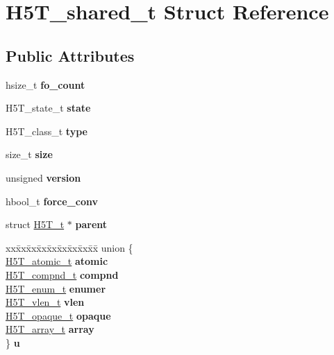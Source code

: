 \hypertarget{struct_h5_t__shared__t}{}\section{H5\+T\+\_\+shared\+\_\+t Struct Reference}
\label{struct_h5_t__shared__t}
\subsection*{Public Attributes}
\begin{DoxyCompactItemize}
\item 
\mbox{\label{struct_h5_t__shared__t_a907201693145b6bb5972f08ad03549a9}} 
hsize\+\_\+t {\bfseries fo\+\_\+count}
\item 
\mbox{\label{struct_h5_t__shared__t_afa6afd223dae67bfd710cae436a75c66}} 
H5\+T\+\_\+state\+\_\+t {\bfseries state}
\item 
\mbox{\label{struct_h5_t__shared__t_a402cd24dfc7b349e3644d9ef77fc1d69}} 
H5\+T\+\_\+class\+\_\+t {\bfseries type}
\item 
\mbox{\label{struct_h5_t__shared__t_a1d54432a0678f4c33b4ea48bd33b652e}} 
size\+\_\+t {\bfseries size}
\item 
\mbox{\label{struct_h5_t__shared__t_a19af917992ac1d4b69a6ffdd1dd8001e}} 
unsigned {\bfseries version}
\item 
\mbox{\label{struct_h5_t__shared__t_a8d68ca3b21ff1a2f5e0a449aa9395254}} 
hbool\+\_\+t {\bfseries force\+\_\+conv}
\item 
\mbox{\label{struct_h5_t__shared__t_a77cdc4361d60b9f0c647cc983d525aa9}} 
struct \hyperlink{struct_h5_t__t}{H5\+T\+\_\+t} $\ast$ {\bfseries parent}
\item 
\mbox{\label{struct_h5_t__shared__t_aa40c24475a8f1d291fa4b2369a83dd64}} 
\begin{tabbing}
xx\=xx\=xx\=xx\=xx\=xx\=xx\=xx\=xx\=\kill
union \{\\
\>\hyperlink{struct_h5_t__atomic__t}{H5T\_atomic\_t} {\bfseries atomic}\\
\>\hyperlink{struct_h5_t__compnd__t}{H5T\_compnd\_t} {\bfseries compnd}\\
\>\hyperlink{struct_h5_t__enum__t}{H5T\_enum\_t} {\bfseries enumer}\\
\>\hyperlink{struct_h5_t__vlen__t}{H5T\_vlen\_t} {\bfseries vlen}\\
\>\hyperlink{struct_h5_t__opaque__t}{H5T\_opaque\_t} {\bfseries opaque}\\
\>\hyperlink{struct_h5_t__array__t}{H5T\_array\_t} {\bfseries array}\\
\} {\bfseries u}\\


\end{tabbing}
\end{DoxyCompactItemize}
